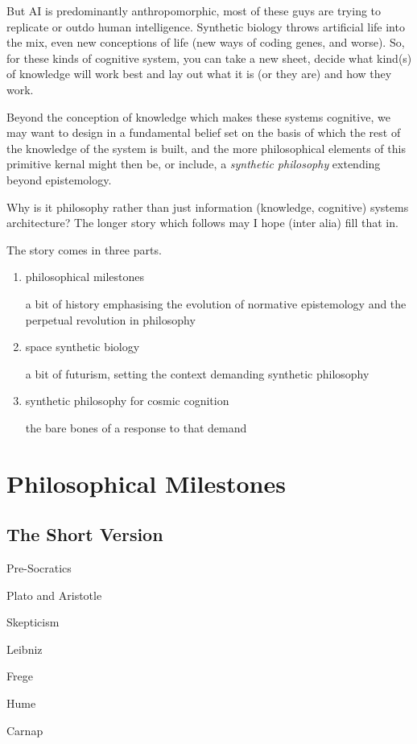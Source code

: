 \documentclass[14pt,titlepage]{extarticle}
\begin{document}
But AI is predominantly anthropomorphic, most of these guys are trying to replicate or outdo human intelligence.
Synthetic biology throws artificial life into the mix, even new conceptions of life (new ways of coding genes, and worse).
So, for these kinds of cognitive system, you can take a new sheet, decide what kind(s) of knowledge will work best and lay out what it is (or they are) and how they work.

Beyond the conception of knowledge which makes these systems cognitive, we may want to design in a fundamental belief set on the basis of which the rest of the knowledge of the system is built, and the more philosophical elements of this primitive kernal might then be, or include, a {\it synthetic philosophy} extending beyond epistemology.

Why is it philosophy rather than just information (knowledge, cognitive) systems architecture?
The longer story which follows may I hope (inter alia) fill that in.

The story comes in three parts.
\begin{enumerate}
\item philosophical milestones

  a bit of history emphasising the evolution of normative epistemology and the perpetual revolution in philosophy
  
\item space synthetic biology

  a bit of futurism, setting the context demanding synthetic philosophy
  
\item synthetic philosophy for cosmic cognition

  the bare bones of a response to that demand

\end{enumerate}

\section{Philosophical Milestones}

\subsection{The Short Version}

\begin{description}
\item Pre-Socratics
\item Plato and Aristotle
\item Skepticism
\item Leibniz
\item Frege
\item Hume
\item Carnap
\end{description}
\end{document}

